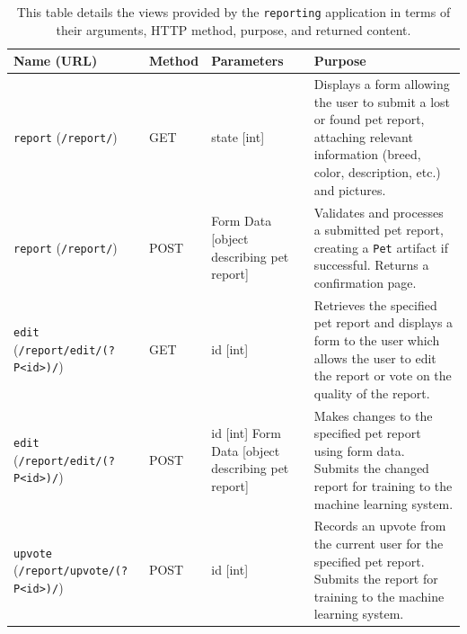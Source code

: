 \begin{table}[htb]
    \caption[Views provided by {\tt reporting} subsystem]{
	This table details the views provided by the {\tt reporting} application in terms of their arguments, HTTP method, purpose, and returned content.
	}
    \begin{center}
    \begin{tabularx}{ \textwidth}{| p{3cm} | p{1.2cm} | p{4cm} | X | } 
    \hline
    	Name (URL) & Method & Parameters & Purpose \\  \hline \hline

	{\tt report} \newline ({\tt /report/}) & GET & state [int] & Displays a form allowing the user to submit a lost or found pet report, attaching relevant information (breed, color, description, etc.) and pictures.\\ \hline
	{\tt report} \newline ({\tt /report/}) & POST & Form Data [object describing pet report] & Validates and processes a submitted pet report, creating a {\tt Pet} artifact if successful.  Returns a confirmation page.\\ \hline
	{\tt edit} \newline ({\tt /report/edit/\newline(?P<id>)/}) & GET & id [int] & Retrieves the specified pet report and displays a form to the user which allows the user to edit the report or vote on the quality of the report.\\ \hline
	{\tt edit} \newline ({\tt /report/edit/\newline(?P<id>)/}) & POST & id [int] \newline Form Data [object describing pet report] & Makes changes to the specified pet report using form data.  Submits the changed report for training to the machine learning system.\\ \hline
	{\tt upvote} \newline ({\tt /report/upvote/\newline(?P<id>)/}) & POST & id [int] & Records an upvote from the current user for the specified pet report.  Submits the report for training to the machine learning system.\\ \hline

	\end{tabularx}
   \\ \rule{0mm}{5mm}
   
	\end{center}
	 \label{table:reporting}
\end{table}

